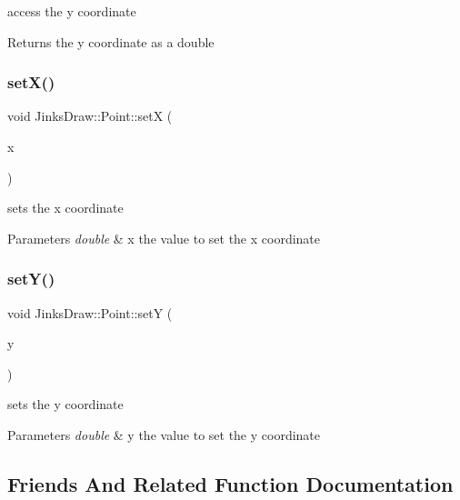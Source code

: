 access the y coordinate 

\begin{DoxyReturn}{Returns}
the y coordinate as a double 
\end{DoxyReturn}
\mbox{\label{class_jinks_draw_1_1_point_a88c728619ffd56b0a05e73aa12a749e1}} 
\subsubsection{\texorpdfstring{set\+X()}{setX()}}
{\footnotesize\ttfamily void Jinks\+Draw\+::\+Point\+::setX (\begin{DoxyParamCaption}\item[{double}]{x }\end{DoxyParamCaption})}



sets the x coordinate 


\begin{DoxyParams}{Parameters}
{\em double} & x the value to set the x coordinate \\
\hline
\end{DoxyParams}
\mbox{\label{class_jinks_draw_1_1_point_a828cbcb4a21065420758e422265dc35f}} 
\subsubsection{\texorpdfstring{set\+Y()}{setY()}}
{\footnotesize\ttfamily void Jinks\+Draw\+::\+Point\+::setY (\begin{DoxyParamCaption}\item[{double}]{y }\end{DoxyParamCaption})}



sets the y coordinate 


\begin{DoxyParams}{Parameters}
{\em double} & y the value to set the y coordinate \\
\hline
\end{DoxyParams}


\subsection{Friends And Related Function Documentation}
\mbox{\label{class_jinks_draw_1_1_point_a9337a82e2ef8fa00c685b1ea4e6beab4}} 
